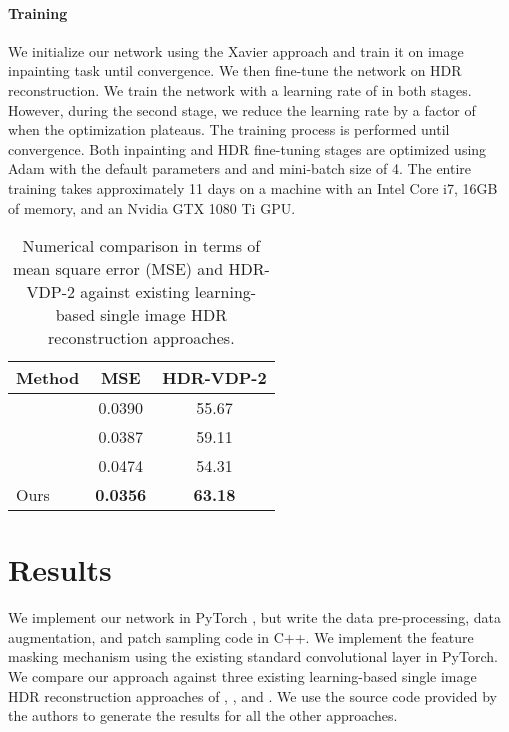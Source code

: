 \vspace{-0.15pt}
\paragraph{Training}
We initialize our network using the Xavier approach \cite{glorot2010understanding} and train it on image inpainting task until convergence. We then fine-tune the network on HDR reconstruction. We train the network with a learning rate of  in both stages. However, during the second stage, we reduce the learning rate by a factor of  when the optimization plateaus. The training process is performed until convergence. Both inpainting and HDR fine-tuning stages are optimized using Adam \cite{kingma2014adam} with the default parameters  and  and mini-batch size of 4. The entire training takes approximately 11 days on a machine with an Intel Core i7, 16GB of memory, and an Nvidia GTX 1080 Ti GPU. 

\begin{table}
\hspace*{-2cm}
\caption{Numerical comparison in terms of mean square error (MSE) and HDR-VDP-2 \cite{mantiuk2011hdr} against existing learning-based single image HDR reconstruction approaches.}
\vspace{-0.1in}
\begin{tabular}{lll}\hline
\textbf{Method}    & \multicolumn{1}{c}{\textbf{MSE}}   & \multicolumn{1}{c}{\textbf{HDR-VDP-2}}        \\\hline
\citet{endo2017deep}  &  \multicolumn{1}{c}{0.0390} &  \multicolumn{1}{c}{55.67}\\
\citet{eilertsen2017hdr}  &  \multicolumn{1}{c}{0.0387} &  \multicolumn{1}{c}{59.11} \\
\citet{marnerides2018expandnet}  & \multicolumn{1}{c}{0.0474}  &  \multicolumn{1}{c}{54.31} \\
Ours  & \multicolumn{1}{c}{\textbf{0.0356}}  & \multicolumn{1}{c}{\textbf{63.18}} \\\hline
\end{tabular}
\label{table:existing}
\vspace{-0.2in}
\end{table}

\section{Results}
\label{sec:results}
We implement our network in PyTorch \cite{paszke2017automatic}, but write the data pre-processing, data augmentation, and patch sampling code in C++.  We implement the feature masking mechanism using the existing standard convolutional layer in PyTorch. We compare our approach against three existing learning-based single image HDR reconstruction approaches of \citet{endo2017deep}, \citet{eilertsen2017hdr}, and \citet{marnerides2018expandnet}. We use the source code provided by the authors to generate the results for all the other approaches.

